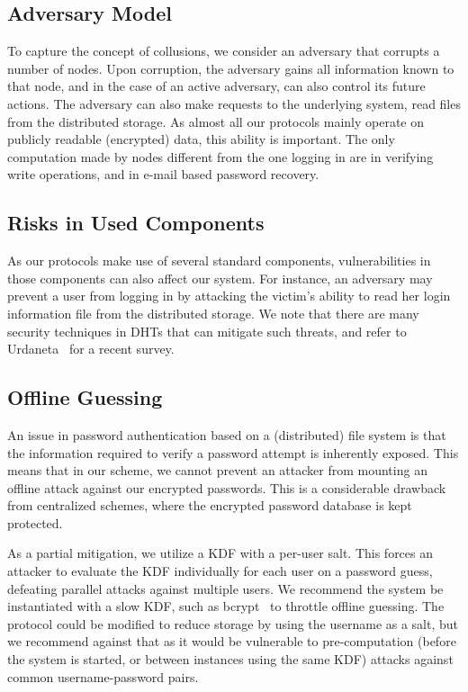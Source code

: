 \subsection{Adversary Model}

To capture the concept of collusions, we consider an adversary 
that corrupts a number of nodes. %
Upon corruption, the adversary gains all information known to that
node, and in the case of an active adversary, can also control its future
actions. The adversary can also make requests to the underlying
system, \eg read files from the distributed storage. As almost all our
protocols mainly operate on publicly readable (encrypted) data, this
ability is important. The only computation made by nodes different from the
one logging in are in verifying write operations, and in e-mail based password
recovery.

\subsection{Risks in Used Components}

As our protocols make use of several standard components, vulnerabilities in those 
components can also affect our system. For instance, an adversary may prevent 
a user from logging in by attacking the victim's ability to read her login 
information file from the distributed storage.
We note that there are many security 
techniques in DHTs that can mitigate such threats, and refer 
to Urdaneta\etal~\cite{UrdanetaPS11} for a recent survey.

\subsection{Offline Guessing}

An issue in password authentication based on a (distributed) file system is
that the information required to verify a password attempt is inherently
exposed. This means that in our scheme, we cannot prevent an attacker from
mounting an offline attack against our encrypted passwords. This is a
considerable drawback from centralized schemes, where the encrypted password
database is kept protected.

As a partial mitigation, we utilize a KDF with a per-user salt. This forces an
attacker to evaluate the KDF individually for each user on a password guess,
defeating parallel attacks against multiple users. We recommend the system be
instantiated with a slow KDF, such as bcrypt~\cite{DBLP:conf/usenix/ProvosM99}
to throttle offline guessing. The protocol could be modified to reduce storage
by using the username as a salt, but we recommend against that as it would be
vulnerable to pre-computation (before the system is started, or between
instances using the same KDF) attacks against common username-password pairs.

